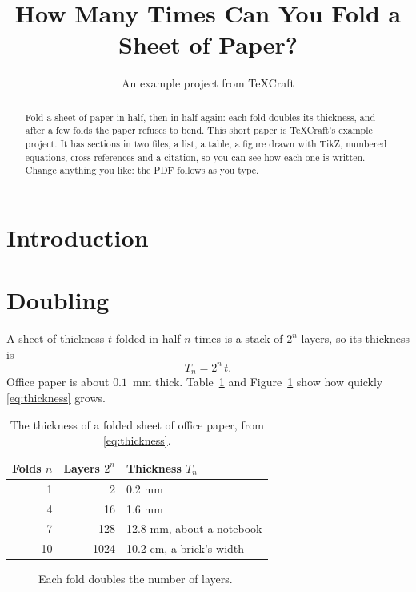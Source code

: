\documentclass[11pt]{article}
\title{How Many Times Can You Fold a Sheet of Paper?}
\author{An example project from TeXCraft}
\date{}
\begin{document}
\maketitle

\begin{abstract}
  Fold a sheet of paper in half, then in half again: each fold doubles its thickness, and
  after a few folds the paper refuses to bend. This short paper is TeXCraft's example
  project. It has sections in two files, a list, a table, a figure drawn with TikZ, numbered
  equations, cross-references and a citation, so you can see how each one is written. Change
  anything you like: the PDF follows as you type.
\end{abstract}

\section{Introduction}


\section{Doubling}
\label{sec:doubling}
A sheet of thickness $t$ folded in half $n$ times is a stack of $2^n$ layers, so its
thickness is
\begin{equation}
  T_n = 2^n \, t .
  \label{eq:thickness}
\end{equation}
Office paper is about $0.1$~mm thick. Table~\ref{tab:folds} and Figure~\ref{fig:growth} show
how quickly \eqref{eq:thickness} grows.

\begin{table}[ht]
  \centering
  \begin{tabular}{rrl}
    \toprule
    Folds $n$ & Layers $2^n$ & Thickness $T_n$ \\
    \midrule
     1 &    2 & 0.2 mm \\
     4 &   16 & 1.6 mm \\
     7 &  128 & 12.8 mm, about a notebook \\
    10 & 1024 & 10.2 cm, a brick's width \\
    \bottomrule
  \end{tabular}
  \caption{The thickness of a folded sheet of office paper, from \eqref{eq:thickness}.}
  \label{tab:folds}
\end{table}

\begin{figure}[ht]
  \centering
  \caption{Each fold doubles the number of layers.}
  \label{fig:growth}
\end{figure}
\end{document}
